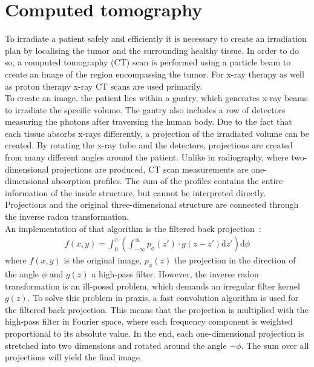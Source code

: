 \section{Computed tomography} \label{sec:ct}
To irradiate a patient safely and efficiently it is necessary to create an irradiation plan by localising the tumor and the surrounding healthy tissue. In order to do so, a computed
tomography (CT) scan is performed using a particle beam to create an image of the region encompassing the tumor. For x-ray therapy as well as proton therapy x-ray CT scans
are used primarily. \\
To create an image, the patient lies within a gantry, which generates x-ray beams to irradiate the specific volume. The gantry also
includes a row of detectors measuring the photons after traversing the human body. Due to the fact that each tissue absorbs
x-rays differently, a projection of the irradiated volume can be created. By rotating the x-ray tube and the detectors, projections are created from many different angles around the patient.
Unlike in radiography, where two-dimensional projections are produced, CT scan measurements are one-dimensional absorption profiles. The sum of the profiles contains
the entire information of the inside structure, but cannot be interpreted directly. Projections and the original three-dimensional structure are connected through
the inverse radon transformation. \\
An implementation of that algorithm is the filtered back \mbox{projection \cite{back_projection}:}
\begin{align}
  f(x,y) = \int_0^{\pi} \left(\int_{-\infty}^{\infty} p_{\phi}(z') \cdot g(z - z') \mathrm{d}z'\right) \mathrm{d}\phi
\end{align}
where $f(x,y)$ is the original image, $p_{\phi}(z)$ the projection in the direction of the angle $\phi$ and $g(z)$ a high-pass filter. However, the inverse
radon transformation is an ill-posed problem, which demands an irregular filter kernel $g(z)$. To solve this problem in praxis, a fast convolution algorithm is used for the
filtered back projection. This means that the projection is multiplied with the high-pass filter in Fourier space, where each frequency component is weighted proportional to its
absolute value. In the end, each one-dimensional projection is stretched into two dimensions and rotated around the angle $-\phi$. The sum over all projections will yield the
final image.


